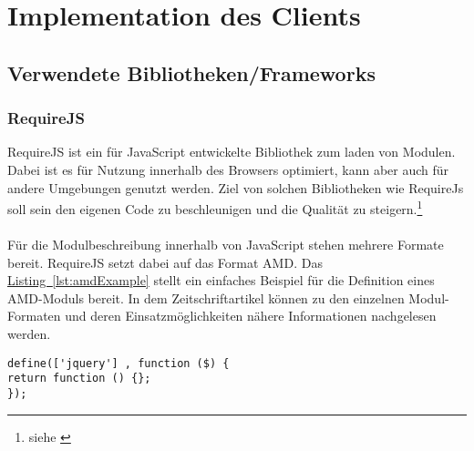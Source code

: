 
\chapter{Implementation des Clients}
\section{Verwendete Bibliotheken/Frameworks}

\subsection{RequireJS}
RequireJS ist ein für JavaScript entwickelte Bibliothek zum laden von Modulen. Dabei ist es für Nutzung innerhalb des Browsers optimiert, kann aber auch für andere Umgebungen genutzt werden. Ziel von solchen Bibliotheken wie RequireJs soll sein den eigenen Code zu beschleunigen und die Qualität zu steigern.\footnote{siehe \cite{requirejs}}\\
\\
Für die Modulbeschreibung innerhalb von JavaScript stehen mehrere Formate bereit. RequireJS setzt dabei auf das Format \gls{AMD}. Das \hyperref[lst:amdExample]{Listing~\ref{lst:amdExample}} stellt ein einfaches Beispiel für die Definition eines \gls{AMD}-Moduls bereit. In dem Zeitschriftartikel \cite{jsModuleDefinitions} können zu den einzelnen Modul-Formaten und deren Einsatzmöglichkeiten nähere Informationen nachgelesen werden.
\begin{lstlisting}[style=lstStyleFramed, caption={[Beispiel: Moduldefinition mittels \acrfull{AMD}\protect\footnote{Quelle: \cite{requirejsExample}}] Beispiel: Moduldefinition mittels \acrfull{AMD}\protect\footnotemark}, label=lst:amdExample]
define(['jquery'] , function ($) {
return function () {};
});
\end{lstlisting}


